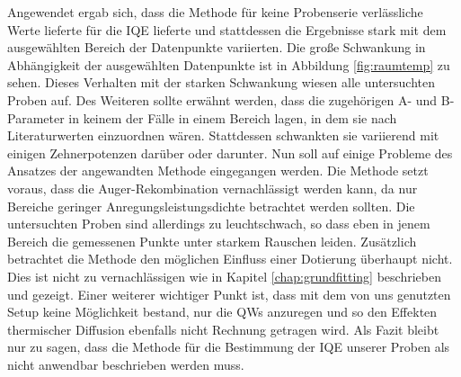 \noindent 
Angewendet ergab sich, dass die Methode für keine Probenserie verlässliche Werte lieferte für die IQE lieferte und stattdessen die Ergebnisse stark mit dem ausgewählten Bereich der Datenpunkte variierten. Die große Schwankung in Abhängigkeit der ausgewählten Datenpunkte ist in Abbildung \ref{fig:raumtemp} zu sehen.
\newline
Dieses Verhalten mit der starken Schwankung wiesen alle untersuchten Proben auf. 
Des Weiteren sollte erwähnt werden, dass die zugehörigen A- und B-Parameter in keinem der Fälle in einem Bereich lagen, in dem sie nach Literaturwerten einzuordnen wären. Stattdessen schwankten sie variierend mit einigen Zehnerpotenzen darüber oder darunter. 
\newline
Nun soll auf einige Probleme des Ansatzes der angewandten Methode eingegangen werden. 
Die Methode setzt voraus, dass die Auger-Rekombination vernachlässigt werden kann, da nur Bereiche geringer Anregungsleistungsdichte betrachtet werden sollten. Die untersuchten Proben sind allerdings zu leuchtschwach, so dass eben in jenem Bereich die gemessenen Punkte unter starkem Rauschen leiden.
\newline
Zusätzlich betrachtet die Methode den möglichen Einfluss einer Dotierung überhaupt nicht. Dies ist nicht zu vernachlässigen wie in Kapitel \ref{chap:grundfitting} beschrieben und gezeigt.
\newline
Einer weiterer wichtiger Punkt ist, dass mit dem von uns genutzten Setup keine Möglichkeit bestand, nur die QWs anzuregen und so den Effekten thermischer Diffusion ebenfalls nicht Rechnung getragen wird. 
\newline
Als Fazit bleibt nur zu sagen, dass die Methode für die Bestimmung der IQE unserer Proben als nicht anwendbar beschrieben werden muss.

